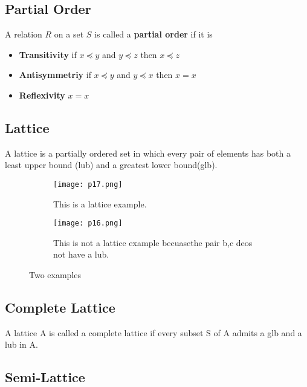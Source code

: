 \subsection{Partial Order}

A relation \(R\) on a set \(S\) is called a \textbf{partial order} if it is

\begin{itemize}
    \item \textbf{Transitivity} if \(x \preceq y\) and  \(y \preceq z\) then  \(x \preceq z\)
    \item \textbf{Antisymmetriy} if \(x \preceq y\) and  \(y \preceq x\) then  \(x = x\)
    \item \textbf{Reflexivity}  \(x = x\)
\end{itemize}    

\subsection{Lattice}

A lattice is a partially ordered set in which every pair of elements has both a least upper bound (lub)
 and a greatest lower bound(glb). 

\begin{figure}[h]
    \centering
    \begin{subfigure}[b]{0.3\textwidth}
        \centering
        \texttt{[image: p17.png]}
        \caption{This is a lattice example.}
        \label{fig:p17}
    \end{subfigure}
    \hfill
    \begin{subfigure}[b]{0.3\textwidth}
        \centering
        \texttt{[image: p16.png]}
        \caption{This is not a lattice example becuasethe pair {b,c} deos not have a lub.}
        \label{fig:three sin x}
    \end{subfigure}
       \caption{Two examples}
       \label{fig:p16}
\end{figure}





\subsection{Complete Lattice}

A lattice A is called a complete lattice if every subset S of A admits a
glb and a lub in A.



\subsection{Semi-Lattice}

